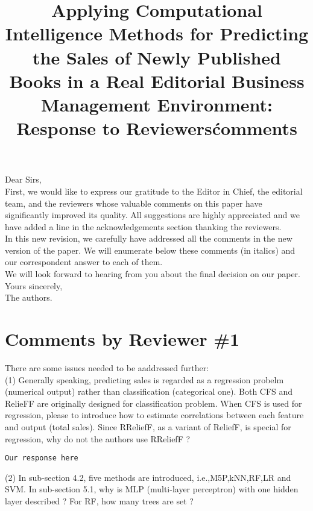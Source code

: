 \documentclass[preprint]{elsarticle}
\begin{document}

\title{Applying Computational Intelligence Methods for Predicting the Sales of Newly Published Books in a Real Editorial Business Management Environment: Response to Reviewers\' comments}

\noindent
Dear Sirs,\\

First, we would like to express our gratitude to the Editor in Chief, the editorial team, and the reviewers whose valuable comments on this paper have significantly improved its quality. All suggestions are highly appreciated and we have added a line in the acknowledgements section thanking the reviewers. \\

In this new revision, we carefully have addressed all the comments in the new version of the paper. We will enumerate below these comments (in italics) and our correspondent answer to each of them. \\

We will look forward to hearing from you about the final decision on our paper. \\

\noindent
Yours sincerely,\\
The authors.


\section{Comments by Reviewer \#1}

\noindent There are some issues needed to be aaddressed further: \\

\noindent (1) Generally speaking, predicting sales is regarded as a regression probelm (numerical output) rather than classification (categorical one). Both CFS and RelieFF are originally designed for classification problem. When CFS is used for regression, please to introduce how to estimate correlations between each feature and output (total sales). Since RReliefF, as a variant of ReliefF, is special for regression, why do not the authors use RReliefF ? \\

\begin{verbatim}
Our response here
\end{verbatim}

\noindent (2) In sub-section 4.2, five methods are introduced, i.e.,M5P,kNN,RF,LR and SVM. In sub-section 5.1, why is MLP (multi-layer perceptron) with one hidden layer described ? For RF, how many trees are set ?\\
\end{document}
